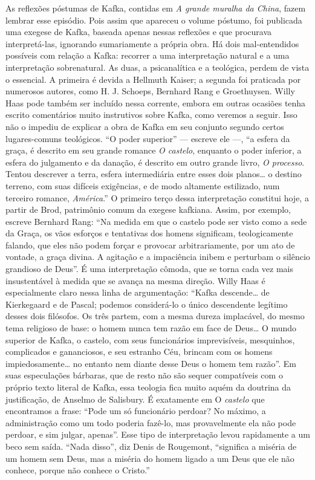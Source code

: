 As reflexões póstumas de Kafka, contidas em \textit{A grande muralha da China},
fazem lembrar esse episódio. Pois assim que apareceu o volume póstumo,
foi publicada uma exegese de Kafka, baseada apenas nessas reflexões e
que procurava interpretá-las, ignorando sumariamente a própria obra. Há
dois mal-entendidos possíveis com relação a Kafka: recorrer a uma
interpretação natural e a uma interpretação sobrenatural. As duas, a
psicanalítica e a teológica, perdem de vista o essencial. A primeira é
devida a Hellmuth Kaiser; a segunda foi praticada por numerosos autores,
como H. J. Schoeps, Bernhard Rang e Groethuysen. Willy Haas pode também
ser incluído nessa corrente, embora em outras ocasiões tenha escrito
comentários muito instrutivos sobre Kafka, como veremos a seguir. Isso
não o impediu de explicar a obra de Kafka em seu conjunto segundo certos
lugares-comuns teológicos. ``O poder superior'' --- escreve ele ---, ``a
esfera da graça, é descrito em seu grande romance \textit{O castelo}, enquanto
o poder inferior, a esfera do julgamento e da danação, é descrito em
outro grande livro, \textit{O processo}. Tentou descrever a terra, esfera
intermediária entre esses dois planos\ldots{} o destino terreno, com suas
difíceis exigências, e de modo altamente estilizado, num terceiro
romance, \textit{América}.'' O primeiro terço dessa interpretação constitui
hoje, a partir de Brod, patrimônio comum da exegese kafkiana. Assim, por
exemplo, escreve Bernhard Rang: ``Na medida em que o castelo pode ser
visto como a sede da Graça, os vãos esforços e tentativas dos homens
significam, teologicamente falando, que eles não podem forçar e provocar
arbitrariamente, por um ato de vontade, a graça divina. A agitação e a
impaciência inibem e perturbam o silêncio grandioso de Deus''. É uma
interpretação cômoda, que se torna cada vez mais insustentável à medida
que se avança na mesma direção. Willy Haas é especialmente claro nessa
linha de argumentação: ``Kafka descende\ldots{} de Kierkegaard e de Pascal;
podemos considerá-lo o único descendente legítimo desses dois filósofos.
Os três partem, com a mesma dureza implacável, do mesmo tema religioso
de base: o homem nunca tem razão em face de Deus\ldots{} O mundo superior de
Kafka, o castelo, com seus funcionários imprevisíveis, mesquinhos,
complicados e gananciosos, e seu estranho Céu, brincam com os homens
impiedosamente\ldots{} no entanto nem diante desse Deus o homem tem razão''.
Em suas especulações bárbaras, que de resto não são sequer compatíveis
com o próprio texto literal de Kafka, essa teologia fica muito aquém da
doutrina da justificação, de Anselmo de Salisbury. É exatamente em O
\textit{castelo} que encontramos a frase: ``Pode um só funcionário perdoar? No
máximo, a administração como um todo poderia fazê-lo, mas provavelmente
ela não pode perdoar, e sim julgar, apenas''. Esse tipo de interpretação
levou rapidamente a um beco sem saída. ``Nada disso'', diz Denis de
Rougemont, ``significa a miséria de um homem sem Deus, mas a miséria do
homem ligado a um Deus que ele não conhece, porque não conhece o
Cristo.''

